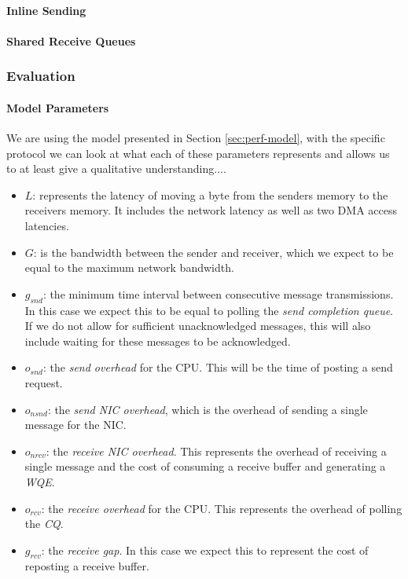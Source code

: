 \paragraph{Inline Sending}
\paragraph{Shared Receive Queues}

\subsubsection{Evaluation}

\paragraph{Model Parameters} We are using the model presented in Section \ref{sec:perf-model}, with the specific protocol 
we can look at what each of these parameters represents and allows us to at least give a qualitative understanding....


\begin{itemize}
  \item $L$: represents the latency of moving a byte from the senders memory to the receivers memory. It includes the 
    network latency as well as two DMA access latencies.
  \item $G$: is the bandwidth between the sender and receiver, which we expect to be equal to the maximum network bandwidth.
  \item $g_{snd}$: the minimum time interval between consecutive message transmissions. In this case we expect this to be 
    equal to polling the \emph{send completion queue}. If we do not allow for sufficient unacknowledged messages, this will
    also include waiting for these messages to be acknowledged.
  \item $o_{snd}$: the \emph{send overhead} for the CPU. This will be the time of posting a send request.
  \item $o_{nsnd}$: the \emph{send NIC overhead}, which is the overhead of sending a single message for the NIC.
  \item $o_{nrcv}$: the \emph{receive NIC overhead}. This represents the overhead of receiving a single message and the cost of 
    consuming a receive buffer and generating a \emph{WQE}.
  \item $o_{rcv}$: the \emph{receive overhead} for the CPU. This represents the overhead of polling the \emph{CQ}.
  \item $g_{rcv}$: the \emph{receive gap}. In this case we expect this to represent the cost of reposting a receive buffer.
\end{itemize}


